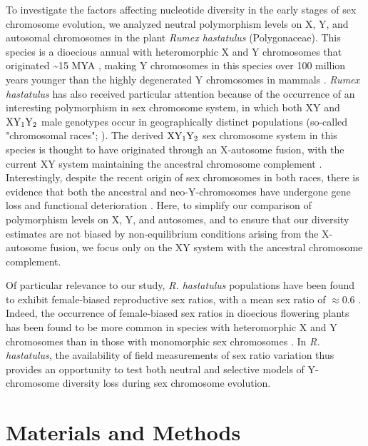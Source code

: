 \documentclass[9pt,twocolumn,twoside,lineno]{gsajnl}
\begin{document}
To investigate the factors affecting nucleotide diversity in the early stages of sex chromosome evolution, we analyzed neutral polymorphism levels on X, Y, and autosomal chromosomes in the plant \textit{Rumex hastatulus }(Polygonaceae). This species is a dioecious annual with heteromorphic X and Y chromosomes that originated \textasciitilde 15 MYA \citep{quesada2011,grabowska2015,navajas2005}, making Y chromosomes in this species over 100 million years younger than the highly degenerated Y chromosomes in mammals \citep{lahn1999,ross2005dna}. \textit{Rumex hastatulus} has also received particular attention because of the occurrence of an interesting polymorphism in sex chromosome system, in which both XY and $\textnormal{XY}_\textnormal{1}\textnormal{Y}_\textnormal{2}$ male genotypes occur in geographically distinct populations (so-called "chromosomal races"; \citealt{smith1963mechanism}). The derived $\textnormal{XY}_\textnormal{1}\textnormal{Y}_\textnormal{2}$ sex chromosome system in this species is thought to have originated through an X-autosome fusion, with the current XY system maintaining the ancestral chromosome complement \citep{smith1964evolving}. Interestingly, despite the recent origin of sex chromosomes in both races, there is evidence that both the ancestral and neo-Y-chromosomes have undergone gene loss and functional deterioration \citep{hough2014}. Here, to simplify our comparison of polymorphism levels on X, Y, and autosomes, and to ensure that our diversity estimates are not biased by non-equilibrium conditions arising from the X-autosome fusion, we focus only on the XY system with the ancestral chromosome complement.

Of particular relevance to our study, \textit{R. hastatulus} populations have been found to exhibit female-biased reproductive sex ratios, with a mean sex ratio of $\approx 0.6$ \citep{pickup2013influence}. Indeed, the occurrence of female-biased sex ratios in dioecious flowering plants has been found to be more common in species with heteromorphic X and Y chromosomes than in those with monomorphic sex chromosomes \citep{field2013comparative,hough2013evolutionarily}. In \textit{R. hastatulus}, the availability of field measurements of sex ratio variation thus provides an opportunity to test both neutral and selective models of Y-chromosome diversity loss during sex chromosome evolution.

\section*{Materials and Methods}
\end{document}

